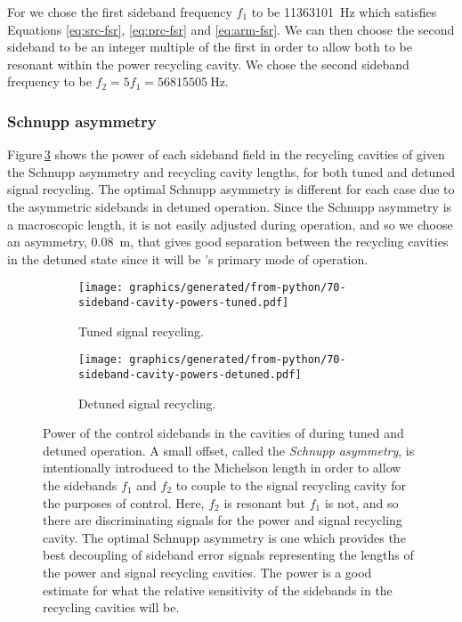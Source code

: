 For \ETLF{} we chose the first sideband frequency $f_1$ to be \SI{11363101}{\hertz} which satisfies Equations \ref{eq:src-fsr}, \ref{eq:prc-fsr} and \ref{eq:arm-fsr}. We can then choose the second sideband to be an integer multiple of the first in order to allow both to be resonant within the power recycling cavity. We chose the second sideband frequency to be $f_2 = 5f_1 = \SI{56815505}{\hertz}$.

\subsubsection{Schnupp asymmetry}
Figure\,\ref{fig:sideband-cavity-powers} shows the power of each sideband field in the recycling cavities of \ETLF{} given the Schnupp asymmetry and recycling cavity lengths, for both tuned and detuned signal recycling. The optimal Schnupp asymmetry is different for each case due to the asymmetric sidebands in detuned operation. Since the Schnupp asymmetry is a macroscopic length, it is not easily adjusted during operation, and so we choose an asymmetry, \SI{0.08}{\meter}, that gives good separation between the recycling cavities in the detuned state since it will be \ETLF{}'s primary mode of operation.

\begin{figure}
  \centering
  \begin{subfigure}{.49\textwidth}
    \texttt{[image: graphics/generated/from-python/70-sideband-cavity-powers-tuned.pdf]}
    \caption[Power of the control sidebands in the cavities of \ETLF{} with tuned signal recycling]{\label{fig:sideband-cavity-powers-tuned}Tuned signal recycling.}
  \end{subfigure}
  \hfill
  \begin{subfigure}{.49\textwidth}
    \texttt{[image: graphics/generated/from-python/70-sideband-cavity-powers-detuned.pdf]}
    \caption[Power of the control sidebands in the cavities of \ETLF{} with tuned signal recycling]{\label{fig:sideband-cavity-powers-detuned}Detuned signal recycling.}
  \end{subfigure}
  \caption[Power of the control sidebands in the cavities of \ETLF{}]{\label{fig:sideband-cavity-powers}Power of the control sidebands in the cavities of \ETLF{} during tuned and detuned operation. A small offset, called the \emph{Schnupp asymmetry}, is intentionally introduced to the Michelson length in order to allow the sidebands $f_1$ and $f_2$ to couple to the signal recycling cavity for the purposes of control. Here, $f_2$ is resonant but $f_1$ is not, and so there are discriminating signals for the power and signal recycling cavity. The optimal Schnupp asymmetry is one which provides the best decoupling of sideband error signals representing the lengths of the power and signal recycling cavities. The power is a good estimate for what the relative sensitivity of the sidebands in the recycling cavities will be.}
\end{figure}

